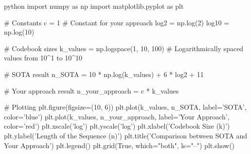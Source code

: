 python
import numpy as np
import matplotlib.pyplot as plt

# Constants
c = 1  # Constant for your approach
log2 = np.log(2)
log10 = np.log(10)

# Codebook sizes
k_values = np.logspace(1, 10, 100)  # Logarithmically spaced values from 10^1 to 10^10

# SOTA result
n_SOTA = 10 * np.log(k_values) + 6 * log2 + 11

# Your approach result
n_your_approach = c * k_values

# Plotting
plt.figure(figsize=(10, 6))
plt.plot(k_values, n_SOTA, label='SOTA', color='blue')
plt.plot(k_values, n_your_approach, label='Your Approach', color='red')
plt.xscale('log')
plt.yscale('log')
plt.xlabel('Codebook Size (k)')
plt.ylabel('Length of the Sequence (n)')
plt.title('Comparison between SOTA and Your Approach')
plt.legend()
plt.grid(True, which="both", ls="--")
plt.show()